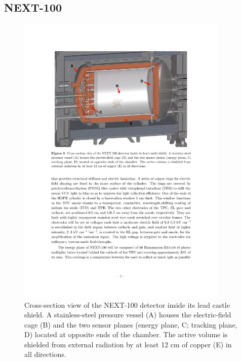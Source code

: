 \subsection{NEXT-100}

\begin{figure}
\centering
\includegraphics[width=0.9\textwidth]{img2/NEXT100.pdf}
\caption{\small Cross-section view of the NEXT-100 detector inside its lead castle shield. A stainless-steel pressure vessel (A) houses the electric-field cage (B) and the two sensor planes (energy plane, C; tracking plane, D) located at opposite ends of the chamber. The active volume is shielded from external radiation by at least 12 cm of copper (E) in all directions.
} \label{fig.NEXT100}
\end{figure}


